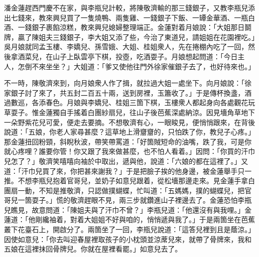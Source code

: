 潘金蓮趕西門慶不在家，與李瓶兒計較，將陳敬濟輸的那三錢銀子，又教李瓶兒添出七錢來，教來興兒買了一隻燒鴨、兩隻雞、一錢銀子下飯、一罈金華酒、一瓶白酒、一錢銀子裹餡涼糕，教來興兒媳婦整理端正。金蓮對着月娘說：「大姐那日鬬牌，贏了陳姐夫三錢銀子，李大姐又添了些，今治了東道兒，請姐姐在花園裡吃。」吳月娘就同孟玉樓、李嬌兒、孫雪娥、大姐、桂姐衆人，先在捲棚內吃了一回，然後拿酒菜兒，在山子上臥雲亭下棋，投壺，吃酒耍子。月娘想起問道：「今日主人，怎倒不來坐坐？」大姐道：「爹又使他往門外徐家催銀子去了，也好待來也。」

不一時，陳敬濟來到，向月娘衆人作了揖，就拉過大姐一處坐下。向月娘說：「徐家銀子討了來了，共五封二百五十兩，送到房裡，玉簫收了。」于是傳杯換盞，酒過數巡，各添春色。月娘與李嬌兒、桂姐三箇下棋，玉樓衆人都起身向各處觀花玩草耍子。惟金蓮獨自手搖着白團紗扇兒，往山子後芭蕉深處納涼。{}因見墻角草地下一朵野紫花兒可愛，便走去要摘。不想敬濟有心，一眼睃見，便悄悄跟來，{}在背後說道：「五娘，你老人家尋甚麼？這草地上滑齏齏的，只怕跌了你，教兒子心疼。」{}那金蓮扭回粉頸，斜睨秋波，帶笑帶罵道：「好箇賊短命的油嘴，跌了我，可是你就心疼哩？誰要你管！你又跟了我來做甚麼，也不怕人看着。」因問：「你買的汗巾兒怎了？」敬濟笑嘻嘻向袖於中取出，遞與他，說道：「六娘的都在這裡了。」又道：「汗巾兒買了來，你把甚來謝我？」于是把臉子挨的他身邊，被金蓮舉手只一推。不想李瓶兒抱着官哥兒，並奶子如意兒跟着，從松墻那邊走來。見金蓮手拿白團扇一動，不知是推敬濟，只認做撲蝴蝶，忙叫道：「五媽媽，撲的蝴蝶兒，把官哥兒一箇耍子。」慌的敬濟趕眼不見，兩三步就鑽進山子裡邊去了。金蓮恐怕李瓶兒瞧見，故意問道：「陳姐夫與了汗巾不曾？」{}李瓶兒道：「他還沒有與我哩。」金蓮道：「他剛纔袖着，對着大姐姐不好與咱的，悄悄遞與我了。」于是兩箇坐在芭蕉叢下花臺石上，開啟分了。兩箇坐了一回，李瓶兒說道：「這答兒裡到且是蔭涼。」因使如意兒：「你去叫迎春屋裡取孩子的小枕頭並涼蓆兒來，就帶了骨牌來，我和五娘在這裡抹回骨牌兒。你就在屋裡看罷。」如意兒去了。

